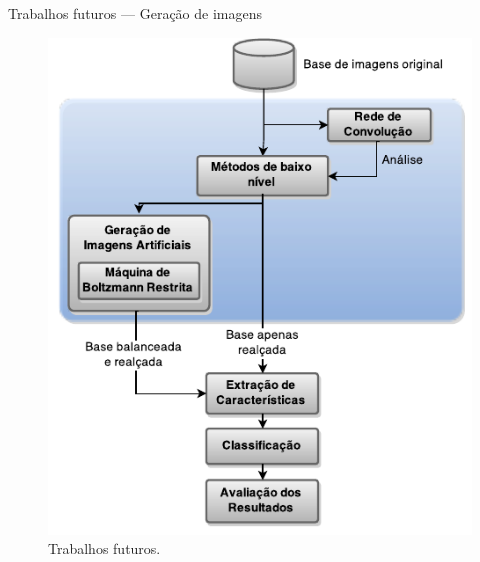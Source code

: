 \documentclass{beamer}
\begin{document}
\begin{frame}{Trabalhos futuros --- Geração de imagens}
  \begin{figure}
    \includegraphics[height=0.75\textheight]{figuras/geral.pdf}
    \caption{Trabalhos futuros.}
  \end{figure}
\end{frame}
\end{document}
